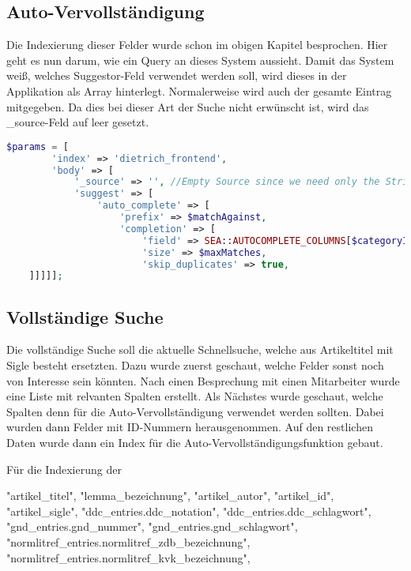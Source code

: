 \subsection{Auto-Vervollständigung}

Die Indexierung dieser Felder wurde schon im obigen Kapitel besprochen. Hier geht es nun darum, wie ein Query an dieses System aussieht. Damit das System weiß, welches Suggestor-Feld verwendet werden soll, wird dieses in der Applikation als Array hinterlegt. Normalerweise wird auch der gesamte Eintrag mitgegeben. Da dies bei dieser Art der Suche nicht erwünscht ist, wird das \_source-Feld auf leer gesetzt.


\begin{lstlisting}[language=PHP, frame=single, label={lst:autocompleParams}] 
    $params = [
        'index' => 'dietrich_frontend',
        'body' => [
            '_source' => '', //Empty Source since we need only the String
            'suggest' => [
                'auto_complete' => [
                    'prefix' => $matchAgainst,
                    'completion' => [
                        'field' => SEA::AUTOCOMPLETE_COLUMNS[$categoryIndex],
                        'size' => $maxMatches,
                        'skip_duplicates' => true,
    ]]]]];
\end{lstlisting}

\subsection{Vollständige Suche}

Die vollständige Suche soll die aktuelle Schnellsuche, welche aus Artikeltitel mit Sigle besteht ersetzten. Dazu wurde zuerst geschaut, welche Felder sonst noch von Interesse sein könnten. Nach einen Besprechung mit einen Mitarbeiter wurde eine Liste mit relvanten Spalten erstellt. Als Nächstes wurde geschaut, welche Spalten denn für die Auto-Vervollständigung verwendet werden sollten. Dabei wurden dann Felder mit ID-Nummern herausgenommen. Auf den restlichen Daten wurde dann ein Index für die Auto-Vervollständigungsfunktion gebaut. 

Für die Indexierung der 


"artikel_titel",
"lemma_bezeichnung",
"artikel_autor",
"artikel_id",
"artikel_sigle",
"ddc_entries.ddc_notation",
"ddc_entries.ddc_schlagwort",
"gnd_entries.gnd_nummer",
"gnd_entries.gnd_schlagwort",
"normlitref_entries.normlitref_zdb_bezeichnung",
"normlitref_entries.normlitref_kvk_bezeichnung",